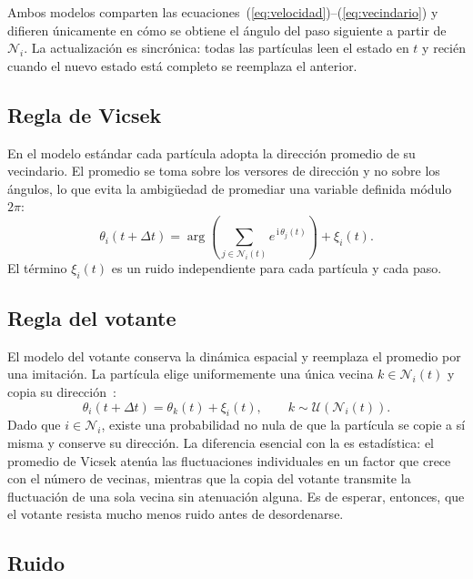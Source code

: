 \documentclass[11pt,a4paper]{article}
\begin{document}
Ambos modelos comparten las ecuaciones~(\ref{eq:velocidad})--(\ref{eq:vecindario})
y difieren únicamente en cómo se obtiene el ángulo del paso siguiente a partir de
$\mathcal{N}_i$. La actualización es sincrónica: todas las partículas leen el
estado en $t$ y recién cuando el nuevo estado está completo se reemplaza el
anterior.

\subsection{Regla de Vicsek}

En el modelo estándar cada partícula adopta la dirección promedio de su
vecindario. El promedio se toma sobre los versores de dirección y no sobre los
ángulos, lo que evita la ambigüedad de promediar una variable definida módulo
$2\pi$:
%
\begin{equation}
\label{eq:vicsek}
\theta_i(t+\Delta t) = \arg\!\left( \sum_{j \in \mathcal{N}_i(t)} e^{\,\mathrm{i}\,\theta_j(t)} \right) + \xi_i(t).
\end{equation}
%
El término $\xi_i(t)$ es un ruido independiente para cada partícula y cada paso.

\subsection{Regla del votante}

El modelo del votante conserva la dinámica espacial y reemplaza el promedio por
una imitación. La partícula elige uniformemente una única vecina
$k \in \mathcal{N}_i(t)$ y copia su dirección~\cite{loscar2021}:
%
\begin{equation}
\label{eq:votante}
\theta_i(t+\Delta t) = \theta_k(t) + \xi_i(t),
\qquad k \sim \mathcal{U}\!\left(\mathcal{N}_i(t)\right).
\end{equation}
%
Dado que $i \in \mathcal{N}_i$, existe una probabilidad no nula de que la
partícula se copie a sí misma y conserve su dirección. La diferencia esencial
con la  es estadística: el promedio de Vicsek atenúa las
fluctuaciones individuales en un factor que crece con el número de vecinas,
mientras que la copia del votante transmite la fluctuación de una sola vecina sin
atenuación alguna. Es de esperar, entonces, que el votante resista mucho menos
ruido antes de desordenarse.

\subsection{Ruido}
\end{document}
